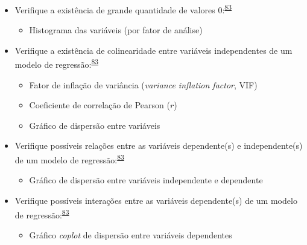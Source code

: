 \documentclass[
  a4paper,
]{book}
\providecommand{\tightlist}{%
  \setlength{\itemsep}{0pt}\setlength{\parskip}{0pt}}
\begin{document}
\begin{itemize}
\item
  Verifique a existência de grande quantidade de valores 0:\textsuperscript{\protect\hyperlink{ref-zuur2009}{83}}

  \begin{itemize}
  \tightlist
  \item
    Histograma das variáveis (por fator de análise)
  \end{itemize}
\end{itemize}

\begin{itemize}
\item
  Verifique a existência de colinearidade entre variáveis independentes de um modelo de regressão:\textsuperscript{\protect\hyperlink{ref-zuur2009}{83}}

  \begin{itemize}
  \item
    Fator de inflação de variância (\emph{variance inflation factor}, VIF)
  \item
    Coeficiente de correlação de Pearson (\(r\))
  \item
    Gráfico de dispersão entre variáveis
  \end{itemize}
\end{itemize}

\begin{itemize}
\item
  Verifique possíveis relações entre as variáveis dependente(s) e independente(s) de um modelo de regressão:\textsuperscript{\protect\hyperlink{ref-zuur2009}{83}}

  \begin{itemize}
  \tightlist
  \item
    Gráfico de dispersão entre variáveis independente e dependente
  \end{itemize}
\end{itemize}

\begin{itemize}
\item
  Verifique possíveis interações entre as variáveis dependente(s) de um modelo de regressão:\textsuperscript{\protect\hyperlink{ref-zuur2009}{83}}

  \begin{itemize}
  \tightlist
  \item
    Gráfico \emph{coplot} de dispersão entre variáveis dependentes
  \end{itemize}
\end{itemize}
\end{document}
